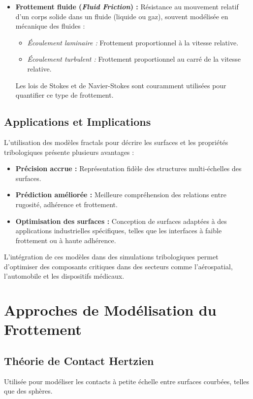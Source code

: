 \begin{itemize}
    \item \textbf{Frottement fluide (\textit{Fluid Friction}) :}  
    Résistance au mouvement relatif d’un corps solide dans un fluide (liquide ou gaz), souvent modélisée en mécanique des fluides :
    \begin{itemize}
        \item \textit{Écoulement laminaire :} Frottement proportionnel à la vitesse relative.
        \item \textit{Écoulement turbulent :} Frottement proportionnel au carré de la vitesse relative.
    \end{itemize}
    Les lois de Stokes et de Navier-Stokes sont couramment utilisées pour quantifier ce type de frottement.
\end{itemize}



\subsection{Applications et Implications}

L'utilisation des modèles fractals pour décrire les surfaces et les propriétés tribologiques présente plusieurs avantages :
\begin{itemize}
    \item \textbf{Précision accrue :} Représentation fidèle des structures multi-échelles des surfaces.
    \item \textbf{Prédiction améliorée :} Meilleure compréhension des relations entre rugosité, adhérence et frottement.
    \item \textbf{Optimisation des surfaces :} Conception de surfaces adaptées à des applications industrielles spécifiques, telles que les interfaces à faible frottement ou à haute adhérence.
\end{itemize}

L'intégration de ces modèles dans des simulations tribologiques permet d'optimiser des composants critiques dans des secteurs comme l'aérospatial, l'automobile et les dispositifs médicaux.

\section{Approches de Modélisation du Frottement}

\subsection{Th\'eorie de Contact Hertzien}
Utilisée pour modéliser les contacts à petite échelle entre surfaces courbées, telles que des sphères.

